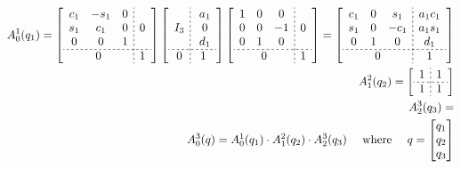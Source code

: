 \documentclass[12pt, a4paper]{extarticle}
\begin{document}
	\begin{align}
		A^1_0(q_1) = \left[
		\begin{array}{c;{2pt/2pt}c}
			\begin{matrix}
				c_1 & -s_1 & 0 \\
				s_1 & c_1 & 0 \\
				0 & 0 & 1
			\end{matrix} & 0 \\ \hdashline[2pt/2pt]
			0 & 1
		\end{array}
		\right]
		\left[
		\begin{array}{c;{2pt/2pt}c}
			I_3 & \; \begin{matrix}
				a_1 \\ 0 \\ d_1
			\end{matrix} \\ \hdashline[2pt/2pt]
			0 & 1
		\end{array}
		\right]
		\left[
		\begin{array}{c;{2pt/2pt}c}
			\begin{matrix}
				1 & 0 & 0 \\
				0 & 0 & -1 \\
				0 & 1 & 0
			\end{matrix} & 0 \\ \hdashline[2pt/2pt]
			0 & 1
		\end{array}
		\right] = \left[
		\begin{array}{c;{2pt/2pt}c}
			\begin{matrix}
				c_1 & 0 & s_1 \\
				s_1 & 0 & -c_1 \\
				0 & 1 & 0
			\end{matrix} & \begin{matrix}
			a_1 c_1 \\
			a_1 s_1 \\
			d_1
		\end{matrix} \\ \hdashline[2pt/2pt]
			0 & 1
		\end{array}
		\right]\\
		A^2_1(q_2) = \left[
		\begin{array}{c;{2pt/2pt}c}
			1 & 1 \\ \hdashline[2pt/2pt]
			1 & 1
		\end{array}
		\right]\\
		A^3_2(q_3) = \\
		A^3_0(q) = A^1_0(q_1) \cdot A^2_1(q_2) \cdot A^3_2(q_3) \quad \text{ where } \quad q = \begin{bmatrix}
			q_1 \\ q_2 \\ q_3
		\end{bmatrix}
	\end{align}
\end{document}
